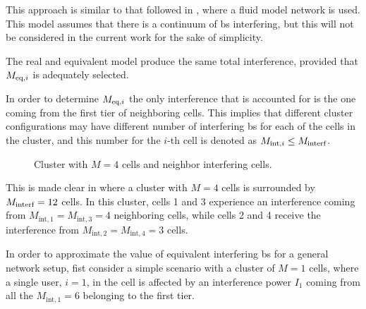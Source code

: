 This approach is similar to that followed in \cite{cheikh11}, where a fluid
model network is used. This model assumes that there is a continuum of \gls{bs}
interfering, but this will not be considered in the current work for the sake of
simplicity.

The real and equivalent model produce the same total interference, provided that
$M_{\text{eq},i}$ is adequately selected.

In order to determine $M_{\text{eq},i}$ the only interference that is accounted for is the
one coming from the first tier of neighboring cells. This implies that different
cluster configurations may have different number of interfering \gls{bs} for
each of the cells in the cluster, and this number for the $i$-th cell is denoted
as $M_{\text{int},i} \leq M_{\text{interf}}$.

\begin{figure}[t]
\begin{center}
    \dummybox
\end{center}
\caption{Cluster with $M=4$ cells and neighbor interfering cells.}
\label{fig:cluster_interf_cells}
\end{figure}

This is made clear in  where a cluster with
$M = 4$ cells is surrounded by $M_{\text{interf}} = 12$ cells. In this cluster, cells 1
and 3 experience an interference coming from $M_{\text{int}, 1} =
M_{\text{int}, 3} = 4$ neighboring cells, while cells 2 and 4 receive the
interference from $M_{\text{int}, 2} = M_{\text{int}, 4} = 3$ cells.

In order to approximate the value of equivalent interfering \gls{bs} for a
general network setup, fist consider a simple scenario  with
a cluster of $M = 1$ cells, where a single user, $i = 1$, in the cell is
affected by an interference power $I_1$ coming from all the
$M_{\text{int}, 1} = 6$ belonging to the first tier.

